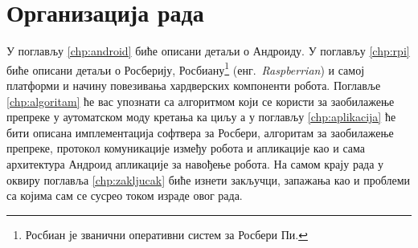 \documentclass[12pt,oneside]{memoir}
\theoremstyle{remark}
\begin{document}
\section{Организација рада}
У поглављу \ref{chp:android} биће описани детаљи о Андроиду. У поглављу \ref{chp:rpi} биће описани детаљи о Росберију, Росбиану\footnote{Росбиан је званични оперативни систем за Росбери Пи.} (енг.~{\em Raspberrian}) и самој платформи и начину повезивања хардверских компоненти робота. Поглавље  \ref{chp:algoritam} ће вас упознати са алгоритмом који се користи за заобилажење препреке у аутоматском моду кретања ка циљу а у поглављу \ref{chp:aplikacija} ће бити описана имплементација софтвера за Росбери, алгоритам за заобилажење препреке, протокол комуникације између робота и апликације као и сама архитектура Андроид апликације за навођење робота. На самом крају рада у оквиру поглавља \ref{chp:zakljucak} биће изнети закључци, запажања као и проблеми са којима сам се сусрео током израде овог рада.





\end{document}
